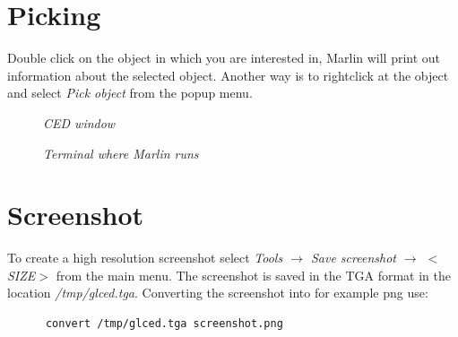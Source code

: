 \documentclass[a4paper,10pt]{article}
\begin{document}
\section{Picking}
Double click on the object in which you are interested in, Marlin will print out information about the selected object. 
Another way is to rightclick at the object and select \textit{Pick object} from the popup menu. 

\begin{figure}[h!]
\begin{minipage}[t]{6cm}
\setlength{\fboxsep}{0mm}
\centerline{}
\caption{\label{CEDViewer} \textsl{CED window}}
\end{minipage}
\hfill
\begin{minipage}[t]{6cm}
\setlength{\fboxsep}{0mm}
\centerline{}
\caption{\label{DSTViewer}\textsl{Terminal where Marlin runs}}
\end{minipage}
\end{figure}
 
\section{Screenshot}
To create a high resolution screenshot select \textit{Tools $\to$ Save screenshot $\to$ $<$SIZE$>$} from the main menu. 
The screenshot is saved in the TGA format in the location \textit{/tmp/glced.tga}. 
Converting the screenshot into for example png use:
 \begin{verbatim}
      convert /tmp/glced.tga screenshot.png 
 \end{verbatim}
\end{document}
